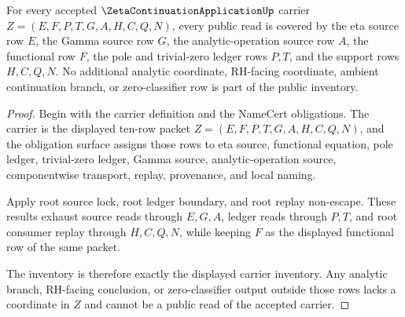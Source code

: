 \begin{theorem}
\label{thm:zeta-continuation-application-row-inventory-coverage}
For every accepted $\ZetaContinuationApplicationUp$ carrier
$Z=(E,F,P,T,G,A,H,C,Q,N)$, every public read is covered by the eta source row
$E$, the Gamma source row $G$, the analytic-operation source row $A$, the
functional row $F$, the pole and trivial-zero ledger rows $P,T$, and the support
rows $H,C,Q,N$. No additional analytic coordinate, RH-facing coordinate,
ambient continuation branch, or zero-classifier row is part of the public
inventory.
\end{theorem}
\begin{proof}
Begin with the carrier definition and the NameCert obligations. The carrier is
the displayed ten-row packet $Z=(E,F,P,T,G,A,H,C,Q,N)$, and the obligation
surface assigns those rows to eta source, functional equation, pole ledger,
trivial-zero ledger, Gamma source, analytic-operation source, componentwise
transport, replay, provenance, and local naming.

Apply root source lock, root ledger boundary, and root replay non-escape. These
results exhaust source reads through $E,G,A$, ledger reads through $P,T$, and
root consumer replay through $H,C,Q,N$, while keeping $F$ as the displayed
functional row of the same packet.

The inventory is therefore exactly the displayed carrier inventory. Any
analytic branch, RH-facing conclusion, or zero-classifier output outside those
rows lacks a coordinate in $Z$ and cannot be a public read of the accepted
carrier.
\end{proof}

